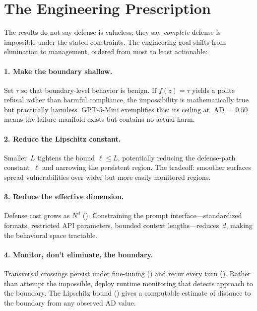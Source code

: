 \documentclass{article}
\newcommand{\AD}{\operatorname{AD}}
\begin{document}
\section{The Engineering Prescription}
\label{sec:engineering}

The results do not say defense is valueless; they say \emph{complete}
defense is impossible under the stated constraints. The engineering
goal shifts from elimination to management, ordered from most to least
actionable:

\paragraph{1. Make the boundary shallow.}
Set $\tau$ so that boundary-level behavior is benign. If $f(z) = \tau$
yields a polite refusal rather than harmful compliance, the
impossibility is mathematically true but practically harmless.
GPT-5-Mini exemplifies this: its ceiling at $\AD = 0.50$ means the
failure manifold exists but contains no actual harm.

\paragraph{2. Reduce the Lipschitz constant.}
Smaller~$L$ tightens the bound $\ell \leq L$, potentially reducing
the defense-path constant~$\ell$ and narrowing the persistent region.
The tradeoff: smoother surfaces spread vulnerabilities over wider but
more easily monitored regions.

\paragraph{3. Reduce the effective dimension.}
Defense cost grows as $N^d$ (). Constraining the prompt
interface---standardized formats, restricted API parameters, bounded
context lengths---reduces~$d$, making the behavioral space tractable.

\paragraph{4. Monitor, don't eliminate, the boundary.}
Transversal crossings persist under fine-tuning ()
and recur every turn (). Rather than attempt the
impossible, deploy runtime monitoring that detects approach to the
boundary. The Lipschitz bound () gives a
computable estimate of distance to the boundary from any observed AD
value.
\end{document}
